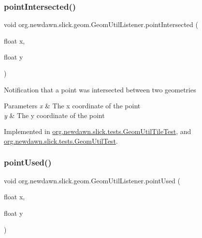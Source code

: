 \subsubsection{\texorpdfstring{point\+Intersected()}{pointIntersected()}}
{\footnotesize\ttfamily void org.\+newdawn.\+slick.\+geom.\+Geom\+Util\+Listener.\+point\+Intersected (\begin{DoxyParamCaption}\item[{float}]{x,  }\item[{float}]{y }\end{DoxyParamCaption})}

Notification that a point was intersected between two geometries


\begin{DoxyParams}{Parameters}
{\em x} & The x coordinate of the point \\
\hline
{\em y} & The y coordinate of the point \\
\hline
\end{DoxyParams}


Implemented in \mbox{\hyperlink{classorg_1_1newdawn_1_1slick_1_1tests_1_1_geom_util_tile_test_a05285204f69079e9aa77a552400f0c0a}{org.\+newdawn.\+slick.\+tests.\+Geom\+Util\+Tile\+Test}}, and \mbox{\hyperlink{classorg_1_1newdawn_1_1slick_1_1tests_1_1_geom_util_test_a5f8bb55e39757622e42b4820a7f6cf2a}{org.\+newdawn.\+slick.\+tests.\+Geom\+Util\+Test}}.

\mbox{\label{interfaceorg_1_1newdawn_1_1slick_1_1geom_1_1_geom_util_listener_a73777bd9904d9472db523c10d644db0a}} 
\subsubsection{\texorpdfstring{point\+Used()}{pointUsed()}}
{\footnotesize\ttfamily void org.\+newdawn.\+slick.\+geom.\+Geom\+Util\+Listener.\+point\+Used (\begin{DoxyParamCaption}\item[{float}]{x,  }\item[{float}]{y }\end{DoxyParamCaption})}

